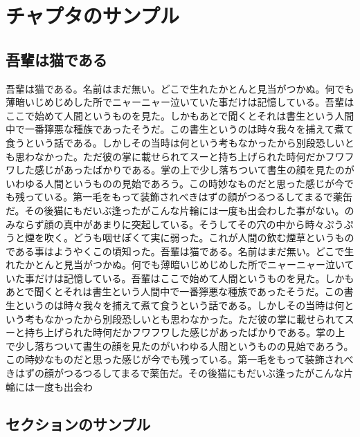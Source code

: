 \documentclass[main]{subfiles}
\begin{document}
\chapter{チャプタのサンプル}

\section{吾輩は猫である}

吾輩は猫である。名前はまだ無い。どこで生れたかとんと見当がつかぬ。何でも薄暗いじめじめした所でニャーニャー泣いていた事だけは記憶している。吾輩はここで始めて人間というものを見た。しかもあとで聞くとそれは書生という人間中で一番獰悪な種族であったそうだ。この書生というのは時々我々を捕えて煮て食うという話である。しかしその当時は何という考もなかったから別段恐しいとも思わなかった。ただ彼の掌に載せられてスーと持ち上げられた時何だかフワフワした感じがあったばかりである。掌の上で少し落ちついて書生の顔を見たのがいわゆる人間というものの見始であろう。この時妙なものだと思った感じが今でも残っている。第一毛をもって装飾されべきはずの顔がつるつるしてまるで薬缶だ。その後猫にもだいぶ逢ったがこんな片輪には一度も出会わした事がない。のみならず顔の真中があまりに突起している。そうしてその穴の中から時々ぷうぷうと煙を吹く。どうも咽せぽくて実に弱った。これが人間の飲む煙草というものである事はようやくこの頃知った。吾輩は猫である。名前はまだ無い。どこで生れたかとんと見当がつかぬ。何でも薄暗いじめじめした所でニャーニャー泣いていた事だけは記憶している。吾輩はここで始めて人間というものを見た。しかもあとで聞くとそれは書生という人間中で一番獰悪な種族であったそうだ。この書生というのは時々我々を捕えて煮て食うという話である。しかしその当時は何という考もなかったから別段恐しいとも思わなかった。ただ彼の掌に載せられてスーと持ち上げられた時何だかフワフワした感じがあったばかりである。掌の上で少し落ちついて書生の顔を見たのがいわゆる人間というものの見始であろう。この時妙なものだと思った感じが今でも残っている。第一毛をもって装飾されべきはずの顔がつるつるしてまるで薬缶だ。その後猫にもだいぶ逢ったがこんな片輪には一度も出会わ

\section{セクションのサンプル}
\end{document}
